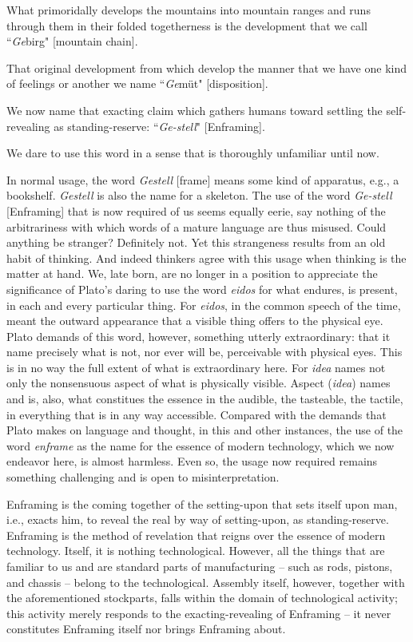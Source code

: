 \documentclass[paper=a4, fontsize=11pt,twoside]{scrartcl}
\begin{document}
What primoridally develops the mountains into mountain ranges and runs through them in their folded togetherness is the development that we call ``\textit{Ge}birg" [mountain chain].

That original development from which develop the manner that we have one kind of feelings or another we name ``\textit{Ge}m{\"u}t" [disposition].

We now name that exacting claim which gathers humans toward settling the self-revealing as standing-reserve: ``\textit{Ge-stell}" [Enframing].

We dare to use this word in a sense that is thoroughly unfamiliar until now.

In normal usage, the word \textit{Gestell} [frame] means some kind of apparatus, e.g., a bookshelf. \textit{Gestell} is also the name for a skeleton. The use of the word \textit{Ge-stell} [Enframing] that is now required of us seems equally eerie, say nothing of the arbitrariness with which words of a mature language are thus misused. Could anything be stranger? Definitely not. Yet this strangeness results from an old habit of thinking. And indeed thinkers agree with this usage when thinking is the matter at hand.  We, late born, are no longer in a position to appreciate the significance of Plato's daring to use the word \textit{eidos} for what endures, is present, in each and every particular thing. For \textit{eidos}, in the common speech of the time, meant the outward appearance that a visible thing offers to the physical eye. Plato demands of this word, however, something utterly extraordinary: that it name precisely what is not, nor ever will be, perceivable with physical eyes. This is in no way the full extent of what is extraordinary here. For \textit{idea} names not only the nonsensuous aspect of what is physically visible. Aspect (\textit{idea}) names and is, also, what constitues the essence in the audible, the tasteable, the tactile, in everything that is in any way accessible. Compared with the demands that Plato makes on language and thought, in this and other instances, the use of the word \textit{enframe} as the name for the essence of modern technology, which we now endeavor here, is almost harmless. Even so, the usage now required remains something challenging and is open to misinterpretation.

Enframing is the coming together of the setting-upon that sets itself upon man, i.e., exacts him, to reveal the real by way of setting-upon, as standing-reserve. Enframing is the method of revelation that reigns over the essence of modern technology. Itself, it is nothing technological. However, all the things that are familiar to us and are standard parts of manufacturing -- such as rods, pistons, and chassis -- belong to the technological. Assembly itself, however, together with the aforementioned stockparts, falls within the domain of technological activity; this activity merely responds to the exacting-revealing of Enframing -- it never constitutes Enframing itself nor brings Enframing about.
\end{document}
